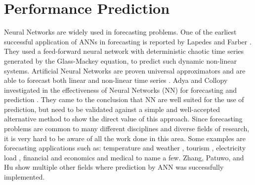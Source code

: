 \section{Performance Prediction}
Neural Networks are widely used in forecasting problems. One of the earliest successful application of ANNs in forecasting is reported by Lapedes and Farber  \cite{LapedesFarber87}. They used a feed-forward neural network with deterministic chaotic time series generated by the Glass-Mackey equation, to predict such dynamic non-linear systems.
Artificial Neural Networks are proven universal approximators  \cite{Hornik1989359} \cite{Hornik1991251} and are able to forecast both linear  \cite{Zhang20011183} and non-linear time series  \cite{Zhang199835}. Adya and Collopy investigated in the effectiveness of Neural Networks (NN) for forecasting and prediction  \cite{neural1}. They came to the conclusion that NN are well suited for the use of prediction, but need to be validated against a simple and well-accepted alternative method to show the direct value of this approach. Since forecasting problems are common to many different disciplines and diverse fields of research, it is very hard to be aware of all the work done in this area.  Some examples are forecasting applications such as: temperature and weather  \cite{Langella2010328} \cite{Buizza} \cite{Roebber}, tourism  \cite{Pattie1996151}, electricity load  \cite{Park76685} \cite{Hippert910780}, financial and economics  \cite{Bodyanskiy20061357} \cite{McAdam2005848} \cite{Kaastra1996215} \cite{Guresen201110389} and medical  \cite{Vukicevic2014} \cite{Arizmendi20145296} to name a few. Zhang, Patuwo, and Hu  \cite{Zhang199835} show multiple other fields where prediction by ANN was successfully implemented.

